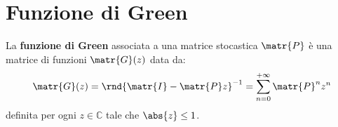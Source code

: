 \documentclass[\main/main.tex]{subfiles}
\begin{document}
\section{Funzione di Green}
\begin{definition}
  La \textbf{funzione di Green} associata a una matrice stocastica \(\matr{P}\) è una matrice di funzioni \(\matr{G}(z)\) data da:
  \[
    \matr{G}(z) = \rnd{\matr{I} - \matr{P}z}^{-1} = \sum_{n=0}^{+\infty} \matr{P}^n z^n
  \]
  definita per ogni \(z \in \mathbb{C}\) tale che \(\abs{z} \leq 1\).
\end{definition}
\end{document}

